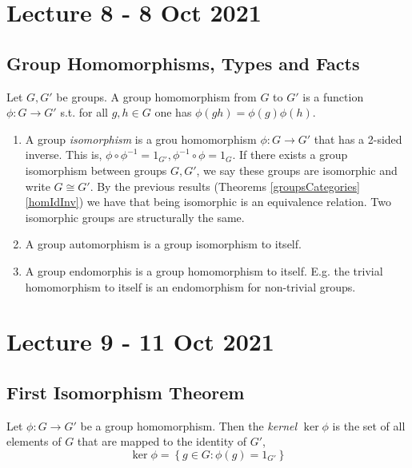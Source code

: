 \documentclass[11pt]{scrartcl}
\begin{document}
\section{Lecture 8 - 8 Oct 2021}

\subsection{Group Homomorphisms, Types and Facts}

\begin{definition}
  Let $G,G'$ be groups. A group homomorphism from $G$ to $G'$ is a function $\phi:G\to G'$
  s.t. for all $g,h\in G$ one has $\phi(gh)=\phi(g) \phi(h)$.
  \label{groupHomomorphism}
\end{definition}

\begin{definition}
  \begin{enumerate}
    \item A group \emph{isomorphism} is a grou homomorphism $\phi:G\to G'$ that has a
      2-sided inverse. This is, $\phi\circ\phi^{-1}=1_{G'},\phi^{-1}\circ\phi=1_G$. If
      there exists a group isomorphism between groups $G,G'$, we say these groups are
      isomorphic and write $G\cong G'$. By the previous results (Theorems
      \ref{groupsCategories} \ref{homIdInv}) we have that being isomorphic is an
      equivalence relation. Two isomorphic groups are structurally the same.

    \item A group automorphism is a group isomorphism to itself.
    \item A group endomorphis is a group homomorphism to itself. E.g. the trivial
      homomorphism to itself is an endomorphism for non-trivial groups.
  \end{enumerate}
  \label{morphismZoo}
\end{definition}

\section{Lecture 9 - 11 Oct 2021}

\subsection{First Isomorphism Theorem}

\begin{definition} 
  Let $\phi:G\to G'$ be a group homomorphism. Then the \emph{kernel} $\ker\phi$ is the set
  of all elements of $G$ that are mapped to the identity of $G'$,
  \[\ker \phi = \left\{ g\in G : \phi(g)=1_{G'} \right\}\]
  \label{kernel}
\end{definition}
\end{document}
